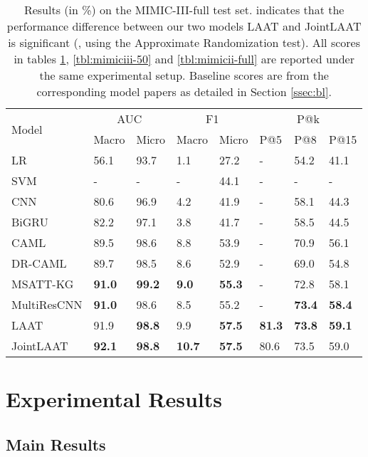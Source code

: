 \documentclass{article}
\begin{document}
\begingroup
\setlength{\tabcolsep}{2.5pt} \renewcommand{\arraystretch}{1.1} \begin{table}[!t]
\centering\small
\begin{tabular}{l|ll|ll|lll}
\hline
 \multirow{2}{*}{{Model}} &
 \multicolumn{2}{c|}{{AUC}} & \multicolumn{2}{c|}{{F1}} & \multicolumn{3}{c}{{P@k}} \\ \cline{2-8}

 &   Macro     & Micro &    Macro &     Micro & P@5 &  P@8 & P@15 \\ \hline
LR & 56.1 & 93.7 & 1.1 & 27.2 & - &    54.2 & 41.1  \\
SVM & - & - & - & 44.1 & - & - & - \\\hline
CNN & 80.6 & 96.9 & 4.2 & 41.9 & - & 58.1 & 44.3 \\
BiGRU & 82.2 & 97.1 & 3.8 & 41.7 & - & 58.5 & 44.5 \\
CAML & 89.5 & 98.6 & 8.8 & 53.9 & - & 70.9 & 56.1 \\
DR-CAML & 89.7 & 98.5 & 8.6 & 52.9 & - & 69.0 & 54.8 \\
MSATT-KG & \textbf{91.0} & \textbf{99.2} & \textbf{9.0} & \textbf{55.3} & - & 72.8 & 58.1 \\
MultiResCNN & \textbf{91.0} & 98.6 & 8.5 & 55.2 & - & \textbf{73.4} & \textbf{58.4} \\\hline\hline
LAAT  & 91.9 & \textbf{98.8} & 9.9 & \textbf{57.5} & \textbf{81.3} & \textbf{73.8} & \textbf{59.1} \\
JointLAAT  & \textbf{92.1} & \textbf{98.8} & \textbf{10.7} & \textbf{57.5} & 80.6 & 73.5 & 59.0 \\

\hline
\end{tabular}
\caption{Results (in \%) on the MIMIC-III-full test set. {\textbf{} indicates that the performance difference between our two models LAAT and JointLAAT is  significant}  (, using  the  Approximate Randomization test). All scores in tables \ref{tbl:mimiciii-full}, \ref{tbl:mimiciii-50} and \ref{tbl:mimicii-full} are reported under the same experimental setup. Baseline scores are from the corresponding model papers as detailed in Section \ref{ssec:bl}.}
\label{tbl:mimiciii-full}
\end{table}
\endgroup

\section{Experimental Results}
\subsection{Main Results}
\end{document}
